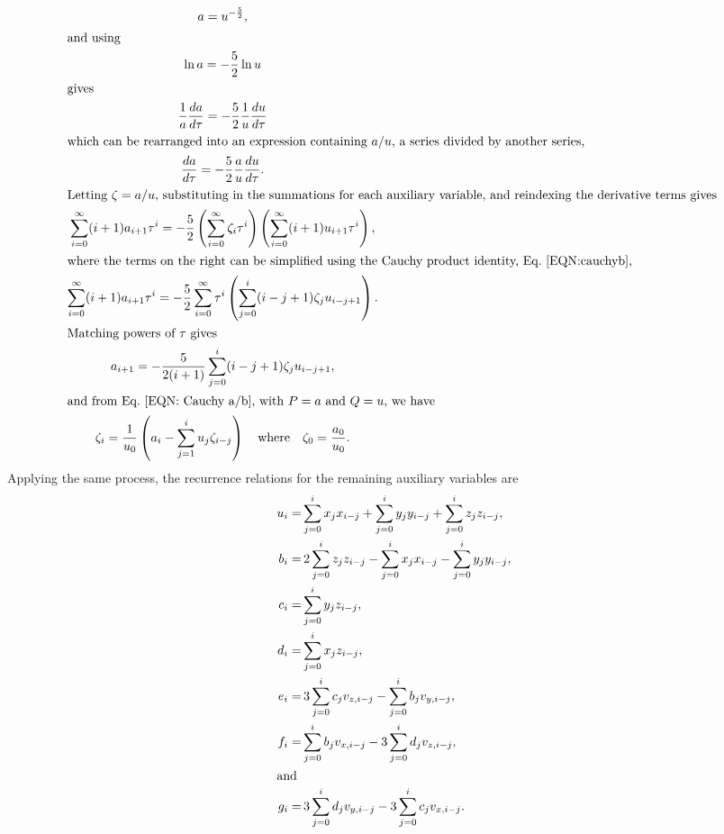 \documentclass{article}
\begin{document}
        \begin{gather*}
            	    a=u^{-\frac{5}{2}},\\
            \intertext{and using}
            	\ln a=-\frac{5}{2}\ln u\\
             \intertext{gives}
            	\frac{1}{a}\frac{da}{d\tau}=-\frac{5}{2}\frac{1}{u}\frac{du}{d\tau}\\
            \intertext{which can be rearranged into an expression containing $a/u$, a series divided by another series,}
            		\frac{da}{d\tau}=-\frac{5}{2}\frac{a}{u}\frac{du}{d\tau}.\\
            \intertext{Letting $\zeta=a/u$, substituting in the summations for each auxiliary variable, and reindexing the derivative terms gives }
            		\sum_{i=0}^\infty (i+1)a_{i+1}\tau^i=-\frac{5}{2}\left( \sum_{i=0}^\infty\zeta_i\tau^i \right)\left( \sum_{i=0}^\infty (i+1)u_{i+1}\tau^i \right), \\
            \intertext{where the terms on the right can be simplified using the Cauchy product identity, Eq.~\eqref{EQN:cauchyb},}
                    	\sum_{i=0}^\infty (i+1)a_{i+1}\tau^i=-\frac{5}{2}\sum_{i=0}^\infty \tau^i\left(\sum_{j=0}^i(i-j+1)\zeta_j u_{i-j+1}\right).\\
            \intertext{Matching powers of $\tau$ gives}
                    a_{i+1}=-\frac{5}{2(i+1)}\sum_{j=0}^i(i-j+1)\zeta_j u_{i-j+1},\\
            \intertext{and from Eq.~\eqref{EQN: Cauchy a/b}, with $P=a$ and $Q=u$, we have}
                \zeta_i=\frac{1}{u_0}\left(a_i-\sum_{j=1}^iu_j\zeta_{i-j}\right)\quad\mbox{where}\quad \zeta_0=\frac{a_0}{u_0}.
        \end{gather*}
Applying the same process, the recurrence relations for the remaining auxiliary variables are
        \begin{align*}
            u_i=&\sum_{j=0}^i x_jx_{i-j}+\sum_{j=0}^i y_jy_{i-j}+\sum_{j=0}^i z_jz_{i-j},\\
            b_i=&\,2\sum_{j=0}^i z_jz_{i-j}-\sum_{j=0}^i x_jx_{i-j}-\sum_{j=0}^i y_jy_{i-j},\\
            c_i=&\sum_{j=0}^i y_jz_{i-j},\\
            d_i=&\sum_{j=0}^i x_jz_{i-j},\\
            e_i=&\,3\sum_{j=0}^i c_jv_{z,i-j}-\sum_{j=0}^i b_jv_{y,i-j},\\
            f_i=&\sum_{j=0}^i b_jv_{x,i-j}-3\sum_{j=0}^i d_jv_{z,i-j},\\
    \intertext{and}
            g_i=&\,3\sum_{j=0}^i d_jv_{y,i-j}-3\sum_{j=0}^i c_jv_{x,i-j}.
        \end{align*}
\end{document}
